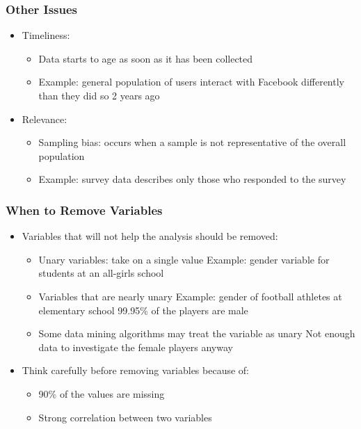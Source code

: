 \begin{frame}[fragile] \frametitle{Other Issues}
\begin{itemize}
\item Timeliness:
	\begin{itemize}
	\item Data starts to age as soon as it has been collected
	\item Example: general population of users interact with Facebook differently than they did so 2 years ago
	\end{itemize}
\item Relevance:
	\begin{itemize}
	\item Sampling bias: occurs when a sample is not representative of the overall population
	\item Example: survey data describes only those who responded to the survey
	\end{itemize}
\end{itemize}
\end{frame}

\begin{frame}[fragile] \frametitle{When to Remove Variables}
\begin{itemize}
\item Variables that will not help the analysis should be removed:
	\begin{itemize}
	\item Unary variables: take on a single value Example: gender variable for students at an all-girls school
	\item Variables that are nearly unary Example: gender of football athletes at elementary school 99.95\% of the players are male
	\item Some data mining algorithms may treat the variable as unary Not enough data to investigate the female players anyway
	\end{itemize}
\item Think carefully before removing variables because of:
	\begin{itemize}
	\item 90\% of the values are missing
	\item Strong correlation between two variables
	\end{itemize}
\end{itemize}
\end{frame}


